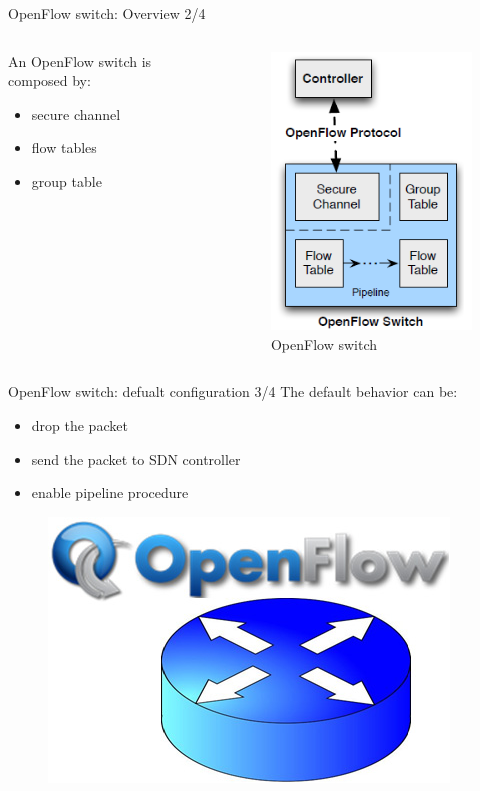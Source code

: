 \begin{frame}{OpenFlow switch: \small{Overview 2/4}}
\begin{columns}
\begin{column}{0.55\textwidth}
An OpenFlow switch is composed by:
\begin{itemize}
\item<2-> secure channel
\item<3-> flow tables
\item<4-> group table
\end{itemize}
\end{column}
\begin{column}{0.45\textwidth}
\begin{figure}
\includegraphics[scale=0.50]{Immagini/OpenFlowSwitch.png}
\caption{OpenFlow switch}
\label{fig:OpenFlowSwitchComponent}
\end{figure}
\end{column}
\end{columns}
\end{frame}

\begin{frame}{OpenFlow switch: \small{defualt configuration 3/4}}
The default behavior can be:
\begin{itemize}
\item<2-> drop the packet
\item<3-> send the packet to SDN controller
\item<4-> enable pipeline procedure
\end{itemize}
\begin{figure}
\includegraphics[scale=0.25]{Immagini/OpenFlowSwitchRouter.jpg}
\end{figure}
\end{frame}

